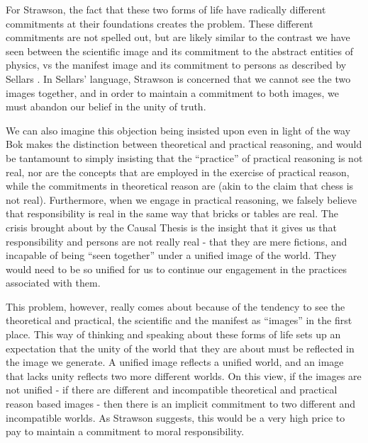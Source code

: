 \documentclass[phd,12pt,oneside,paper=letterpaper]{ubcthesis}
\begin{document}
For Strawson, the fact that these two forms of life have radically different commitments at their foundations creates the problem. These different commitments are not spelled out, but are likely similar to the contrast we have seen between the scientific image and its commitment to the abstract entities of physics, vs the manifest image and its commitment to persons as described by Sellars \citep{sellars1962}. In Sellars' language, Strawson is concerned that we cannot see the two images together, and in order to maintain a commitment to both images, we must abandon our belief in the unity of truth.

We can also imagine this objection being insisted upon even in light of the way Bok makes the distinction between theoretical and practical reasoning, and would be tantamount to simply insisting that the ``practice'' of practical reasoning is not real, nor are the concepts that are employed in the exercise of practical reason, while the commitments in theoretical reason are (akin to the claim that chess is not real). Furthermore, when we engage in practical reasoning, we falsely believe that responsibility is real in the same way that bricks or tables are real. The crisis brought about by the Causal Thesis is the insight that it gives us that responsibility and persons are not really real - that they are mere fictions, and incapable of being ``seen together'' under a unified image of the world. They would need to be so unified for us to continue our engagement in the practices associated with them. 

This problem, however, really comes about because of the tendency to see the theoretical and practical, the scientific and the manifest as ``images'' in the first place. This way of thinking and speaking about these forms of life sets up an expectation that the unity of the world that they are about must be reflected in the image we generate. A unified image reflects a unified world, and an image that lacks unity reflects two more different worlds. On this view, if the images are not unified - if there are different and incompatible theoretical and practical reason based images - then there is an implicit commitment to two different and incompatible worlds. As Strawson suggests, this would be a very high price to pay to maintain a commitment to moral responsibility. 
\end{document}
